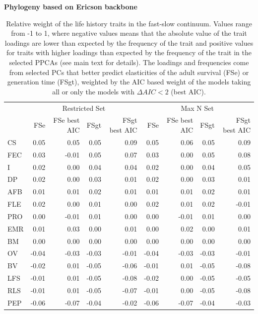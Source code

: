 \clearpage%
\begin{table}
\center
\caption[LHT relative importance of the FS axes]{
Relative weight of the life history traits in the fast-slow continuum. Values
range from -1 to 1, where negative values means that the absolute value of the
trait loadings are lower than expected by the frequency of the trait and
positive values for traits with higher loadings than expected by the frequency
of the trait in the selected PPCAs (see main text for details). The loadings and
frequencies come from selected PCs that better predict elasticities of the
adult survival (FSe) or generation time (FSgt), weighted by the AIC based weight
of the models taking all or only the models with $\Delta AIC < 2$ (best AIC).
}
\label{tab:tabApp2.3}
\begin{footnotesize}

\textbf{Phylogeny based on Ericson backbone}

\begin{tabular}{@{}l|rrrr|rrrr@{}}
\toprule
  & \multicolumn{4}{c|}{Restricted Set} & \multicolumn{4}{c}{Max N Set}\\
  & FSe & FSe best AIC & FSgt & FSgt best AIC & FSe & FSe best AIC & FSgt & FSgt best AIC\\
\midrule
CS & 0.05 & 0.05 & 0.05 & 0.09 & 0.05 & 0.06 & 0.05 & 0.09\\
FEC & 0.03 & -0.01 & 0.05 & 0.07 & 0.03 & 0.00 & 0.05 & 0.08\\
I & 0.02 & 0.00 & 0.04 & 0.04 & 0.02 & 0.00 & 0.04 & 0.05\\
DP & 0.02 & 0.00 & 0.03 & 0.01 & 0.02 & 0.00 & 0.03 & 0.01\\
AFB & 0.01 & 0.01 & 0.02 & 0.01 & 0.01 & 0.01 & 0.02 & 0.01\\
FLE & 0.02 & 0.00 & 0.01 & 0.00 & 0.02 & 0.01 & 0.02 & -0.01\\
PRO & 0.00 & -0.01 & 0.01 & 0.00 & 0.00 & -0.01 & 0.01 & 0.00\\
EMR & 0.01 & 0.03 & 0.00 & 0.01 & 0.00 & 0.02 & 0.00 & 0.01\\
BM & 0.00 & 0.00 & 0.00 & 0.00 & 0.00 & 0.00 & 0.00 & 0.00\\
OV & -0.04 & -0.03 & -0.03 & -0.01 & -0.04 & -0.03 & -0.03 & -0.01\\
BV & -0.02 & 0.01 & -0.05 & -0.06 & -0.01 & 0.01 & -0.05 & -0.08\\
LFS & -0.01 & 0.01 & -0.05 & -0.08 & -0.02 & 0.00 & -0.05 & -0.05\\
RLS & -0.01 & 0.01 & -0.05 & -0.07 & -0.01 & 0.00 & -0.05 & -0.08\\
PEP & -0.06 & -0.07 & -0.04 & -0.02 & -0.06 & -0.07 & -0.04 & -0.03\\
\bottomrule
\end{tabular}


\end{footnotesize}
\end{table}
